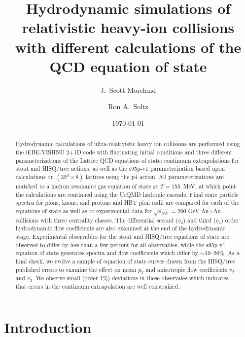 \documentclass[aps,prc,reprint,amsmath,nofootinbib,superscriptaddress]{revtex4-1}
\begin{document}
\title{Hydrodynamic simulations of relativistic heavy-ion collisions\\ with different calculations of the QCD equation of state}

\author{J.\ Scott Moreland}
\author{Ron A.\ Soltz}

\date{\today}

\begin{abstract}
Hydrodynamic calculations of ultra-relativistic heavy ion collisions are performed using the iEBE-VISHNU 2+1D code with fluctuating initial conditions and three different parameterizations of the Lattice QCD equations of state: continuum extrapolations for stout and HISQ/tree actions, as well as the s95p-v1 parameterization based upon calculations on $(32^3 \times 8)$ lattices using the p4 action.  All parameterizations are matched to a hadron resonance gas equation of state at $T=$155~MeV, at which point the calculations are continued using the UrQMD hadronic cascade. Final state particle spectra for pions, kaons, and protons and HBT pion radii are compared for each of the equations of state as well as to experimental data for $\sqrt{s_{NN}}=200$ GeV Au+Au collisions with three centrality classes. The differential second ($v_2$) and third ($v_3$) order hydrodynamic flow coefficients are also examined at the end of the hydrodynamic stage. Experimental observables for the stout and HISQ/tree equations of state are observed to differ by less than a few percent for all observables, while the s95p-v1 equation of state generates spectra and flow coefficients which differ by $\sim$10--20\%. As a final check, we evolve a sample of equation of state curves drawn from the HISQ/tree published errors to examine the effect on mean $p_T$ and anisotropic flow coefficients $v_2$ and $v_3$. We observe small (order 1\%) deviations in these observales which indicates that errors in the continuum extrapolation are well constrained. 
\end{abstract}

\maketitle

\section{Introduction}
\end{document}
